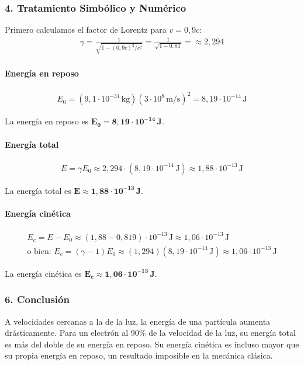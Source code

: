 \subsubsection*{4. Tratamiento Simbólico y Numérico}
Primero calculamos el factor de Lorentz para $v=0,9c$:
\begin{gather}
    \gamma = \frac{1}{\sqrt{1-(0,9c)^2/c^2}} = \frac{1}{\sqrt{1-0,81}} = 
    \approx 2,294
\end{gather}
\paragraph{Energía en reposo}
\begin{gather}
    E_0 = (9,1\cdot10^{-31}\,\text{kg})(3\cdot10^8\,\text{m/s})^2 = 8,19\cdot10^{-14}\,\text{J}
\end{gather}
\begin{cajaresultado}
La energía en reposo es $\boldsymbol{E_0 = 8,19\cdot10^{-14}\,\textbf{J}}$.
\end{cajaresultado}

\paragraph{Energía total}
\begin{gather}
    E = \gamma E_0 \approx 2,294 \cdot (8,19\cdot10^{-14}\,\text{J}) \approx 1,88\cdot10^{-13}\,\text{J}
\end{gather}
\begin{cajaresultado}
La energía total es $\boldsymbol{E \approx 1,88\cdot10^{-13}\,\textbf{J}}$.
\end{cajaresultado}

\paragraph{Energía cinética}
\begin{gather}
    E_c = E - E_0 \approx (1,88-0,819)\cdot10^{-13}\,\text{J} \approx 1,06\cdot10^{-13}\,\text{J} \\
    \text{o bien: } E_c = (\gamma-1)E_0 \approx (1,294)(8,19\cdot10^{-14}\,\text{J}) \approx 1,06\cdot10^{-13}\,\text{J}
\end{gather}
\begin{cajaresultado}
La energía cinética es $\boldsymbol{E_c \approx 1,06\cdot10^{-13}\,\textbf{J}}$.
\end{cajaresultado}

\subsubsection*{6. Conclusión}
\begin{cajaconclusion}
A velocidades cercanas a la de la luz, la energía de una partícula aumenta drásticamente. Para un electrón al 90\% de la velocidad de la luz, su energía total es más del doble de su energía en reposo. Su energía cinética es incluso mayor que su propia energía en reposo, un resultado imposible en la mecánica clásica.
\end{cajaconclusion}

